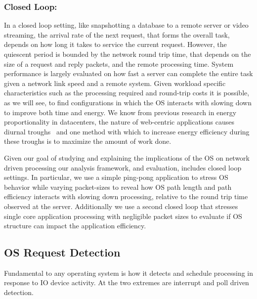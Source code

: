 \subsubsection{Closed Loop:}
In a closed loop setting, like snapshotting a database to a remote server or video streaming, the arrival rate of the next request, that forms the overall task, depends on how long it takes to service the current request.  However, the quiescent period is bounded by the network round trip time, that depends on  the size of a request and reply packets, and the remote processing time.   System performance is largely evaluated on how fast a server can complete the entire task given a network link speed and a remote system.  Given workload specific characteristics such as the processing required and round-trip costs it is possible, as we will see, to find configurations in which the OS interacts with slowing down to improve both time and energy. We know from previous research in energy proportionality in datacenters, the nature of web-centric applications causes diurnal troughs~\cite{Barroso:2009:DCI:1643608, oldi-study, oldi-pegasus, warehouse-power, energyproportion, WebSearch} and one method with which to increase energy efficiency during these troughs is to maximize the amount of work done. 

Given our goal of studying and explaining the implications of the OS on network driven processing our analysis framework, and evaluation, includes closed loop settings.  In particular, we use a simple ping-pong application to stress OS behavior while varying packet-sizes to reveal how OS path length and path efficiency interacts with slowing down processing, relative to the round trip time observed at the server.  Additionally we use a second closed loop that stresses single core application processing with negligible packet sizes to evaluate if OS structure can impact the application efficiency.  

\subsection{OS Request Detection}

Fundamental to any operating system is how it detects and schedule processing in response to IO device activity.  At the two extremes are interrupt and poll driven detection.  

